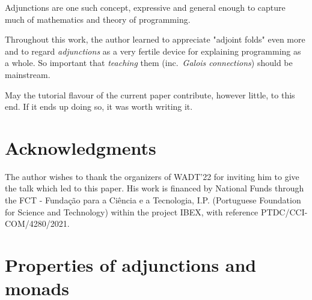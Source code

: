 \documentclass{elsarticle}
\begin{document}
Adjunctions are one such concept, expressive and general enough to capture
much of mathematics and theory of programming.

Throughout this work, the author learned to appreciate "adjoint folds" even more and to regard
\emph{adjunctions} as a very fertile device for explaining programming as a whole.
So important that \emph{teaching} them (inc.\ \emph{Galois connections}) should be mainstream.

May the tutorial flavour of the current paper contribute, however little, to this end.
If it ends up doing so, it was worth writing it.

\section*{Acknowledgments}

The author wishes to thank the organizers of WADT'22 for inviting him to give the
talk which led to this paper. His work is financed by National Funds through
the FCT - Funda\c c\~ao para a Ci\^encia e a Tecnologia, I.P. (Portuguese
Foundation for Science and Technology) within the project IBEX, with reference
PTDC/CCI-COM/4280/2021.

\appendix

\section{Properties of adjunctions and monads}
\end{document}
